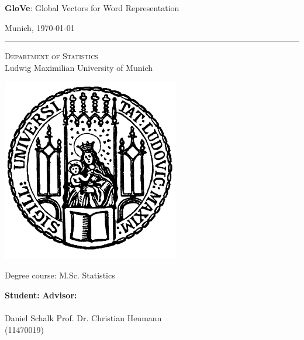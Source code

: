 \Large

\textbf{GloVe}: Global Vectors for Word Representation

\vspace{0.5cm}

\LARGE

Munich, \today

\rule{\textwidth}{0.5pt}

\vspace{0.6cm}

\begin{center}
\LARGE
\textsc{Department of Statistics} \\
\Large
Ludwig Maximilian University of Munich
\end{center}

\vspace{0.5cm}

\includegraphics[height=8cm]{images/logos/LMU_logo.pdf}

\flushleft
\Large
\vspace*{\fill}
\begin{center}
Degree course: M.Sc. Statistics
\end{center}
\vspace{0.5cm}
\normalsize

\begin{tabbing}
\=\textbf{Student:}  \hspace{7cm}  \=\textbf{Advisor:}\\ \\ 
\>Daniel Schalk       \>Prof. Dr. Christian Heumann\\
\>(11470019)
\end{tabbing}

\thispagestyle{empty}

\normalsize
